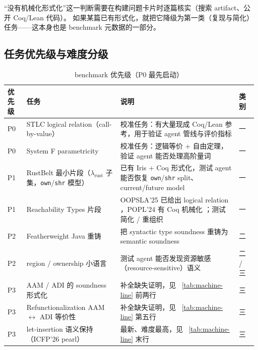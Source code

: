 \begin{remark}
  ``没有机械化形式化''这一判断需要在构建问题卡片时逐篇核实（搜索 artifact、公开 Coq/Lean 代码）。
  如果某篇已有形式化，就把它降级为第一类（复现与简化）任务——这本身也是 benchmark 元数据的一部分。
\end{remark}

\subsection{任务优先级与难度分级}

\begin{table}[htbp]
\centering
\caption{benchmark 优先级（P0 最先启动）}
\label{tab:priority}
\begin{tabular}{@{}p{}p{}p{}p{}@{}}
\toprule
\textbf{优先级} & \textbf{任务} & \textbf{说明} & \textbf{类别} \\
\midrule
P0 & STLC logical relation（call-by-value） & 校准任务：有大量现成 Coq/Lean 参考，用于验证 agent 管线与评价指标 & 一 \\
P0 & System F parametricity & 校准任务：逻辑等价 + 自由定理，验证 agent 能否处理高阶量词 & 一 \\
P1 & RustBelt 最小片段（$\lambda_{\mathrm{rust}}$ 子集，\texttt{own}/\texttt{shr} 模型） & 已有 Iris + Coq 形式化，测试 agent 能否恢复 \texttt{own}/\texttt{shr} split、current/future model & 一 \\
P1 & Reachability Types 片段 & OOPSLA'25 已给出 logical relation \citep{Bao2025ReachabilityLR}，POPL'24 有 Coq 机械化 \citep{Bao2024PolyReachability}；测试简化 / 重组织 & 一 \\
P2 & Featherweight Java 重铸 & 把 syntactic type soundness 重铸为 semantic soundness \citep{Igarashi2001FJ} & 二 \\
P2 & region / ownership 小语言 & 测试 agent 能否发现资源敏感（resource-sensitive）语义 & 二 / 三 \\
P3 & AAM / ADI 的 soundness 形式化 & 补全缺失证明，见 \tablename~\ref{tab:machine-line} 前两行 & 三 \\
P3 & Refunctionalization AAM $\leftrightarrow$ ADI 等价性 & 补全缺失证明，见 \tablename~\ref{tab:machine-line} 第五行 & 三 \\
P3 & let-insertion 语义保持（ICFP'26 pearl） & 最新、难度最高，见 \tablename~\ref{tab:machine-line} 末行 & 三 \\
\bottomrule
\end{tabular}
\end{table}

